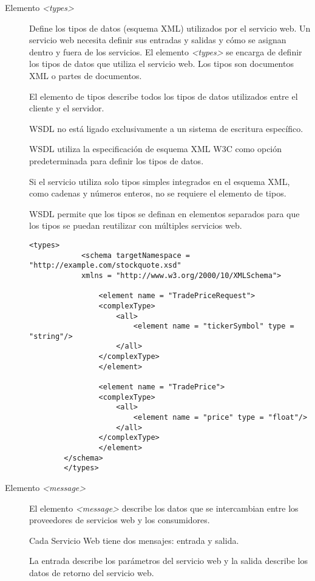  \begin{description}
 	\item  [Elemento \textit{<types>}] Define los tipos de datos (esquema XML) utilizados por el servicio web. 
 	Un servicio web necesita definir sus entradas y salidas y cómo se asignan dentro y fuera de los servicios. El elemento \textit{<types>} se encarga de definir los tipos de datos que utiliza el servicio web. Los tipos son documentos XML o partes de documentos.
 	
 	El elemento de tipos describe todos los tipos de datos utilizados entre el cliente y el servidor.
 	
 	WSDL no está ligado exclusivamente a un sistema de escritura específico.
 	
 	WSDL utiliza la especificación de esquema XML W3C como opción predeterminada para definir los tipos de datos.
 	
 	Si el servicio utiliza solo tipos simples integrados en el esquema XML, como cadenas y números enteros, no se requiere el elemento de tipos.
 	
 	WSDL permite que los tipos se definan en elementos separados para que los tipos se puedan reutilizar con múltiples servicios web.
 	
 	\begin{lstlisting}[label=wsdl:types, caption= Descripci\'on de elemento \textit{<types>}. Tomado de \WC]
		<types>
			<schema targetNamespace = "http://example.com/stockquote.xsd"
			xmlns = "http://www.w3.org/2000/10/XMLSchema">
		
				<element name = "TradePriceRequest">
				<complexType>
					<all>
						<element name = "tickerSymbol" type = "string"/>
					</all>
				</complexType>
				</element>
		
				<element name = "TradePrice">
				<complexType>
					<all>
						<element name = "price" type = "float"/>
					</all>
				</complexType>
				</element>	
		</schema>
		</types>
 	\end{lstlisting}
 	
 	
 	\item  [Elemento \textit{<message>}] 	
 	El elemento \textit{<message>} describe los datos que se intercambian entre los proveedores de servicios web y los consumidores.
 	
 	Cada Servicio Web tiene dos mensajes: entrada y salida.
 	
 	La entrada describe los parámetros del servicio web y la salida describe los datos de retorno del servicio web.
 	

\end{description}
